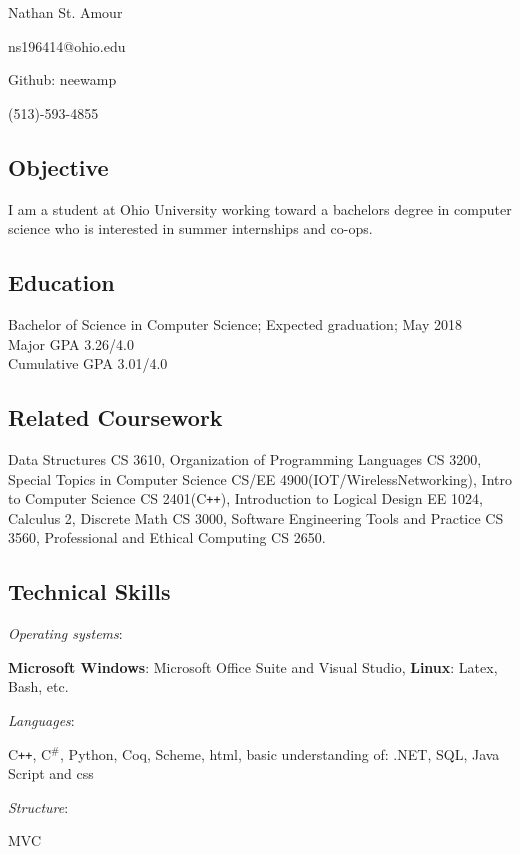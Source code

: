 \documentclass[11pt]{article} %
\newcommand{\name}[1]{
  \centerline{\Huge{#1}}
  }
\begin{document}
\thispagestyle{empty}
\name{Nathan St. Amour}
\begin{center}

 
 
\centerline{\large{ns196414@ohio.edu}}
\centerline{Github: neewamp}
\centerline{\large{(513)-593-4855}}

\end{center}
 \subsection*{Objective}
 I am a student at Ohio University working toward a bachelors degree in computer science who is interested in summer internships and co-ops.
  \subsection*{Education}
  Bachelor of Science in Computer Science; Expected graduation; May 2018\\
  Major GPA    3.26/4.0 \\
Cumulative GPA   3.01/4.0


\subsection*{Related Coursework}
Data Structures CS 3610, Organization of Programming Languages CS 3200, Special Topics in Computer Science CS/EE 4900(IOT/WirelessNetworking), Intro to Computer Science CS 2401(C\texttt{++}), Introduction to Logical Design EE 1024, Calculus 2, Discrete Math CS 3000, Software Engineering Tools and Practice CS 3560, Professional and Ethical Computing CS 2650.
\subsection*{Technical Skills}


\begin{bf}\emph {Operating systems}:\end{bf}\textbf { Microsoft Windows}: Microsoft Office Suite and Visual Studio, \textbf{Linux}:  Latex, Bash,  etc.\\
\begin{bf}\emph {Languages}:\end{bf} C\texttt{++}, C$^\texttt{\#}$, Python, Coq, Scheme,  html, basic understanding of: .NET, SQL, Java Script and css  \\ 
\begin{bf}\emph {Structure}:\end{bf} MVC
\end{document}

